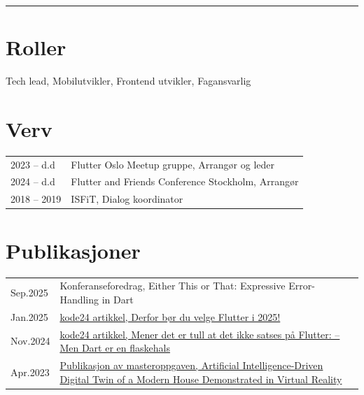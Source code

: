 \documentclass[a4paper,10pt]{article}
\begin{document}
\begin{paracol}{2}
\vspace{0.5em} 
\noindent\rule{\linewidth}{0.2pt}

\section{\ubuntu Roller}
Tech lead, \hspace{0.1em}
Mobilutvikler, \hspace{0.1em}
Frontend utvikler, \hspace{0.1em}
Fagansvarlig

\end{paracol}

\newpage



 
\section{Verv}
\begin{tabularx}{\linewidth}{@{}lX@{}}
2023 -- d.d & Flutter Oslo Meetup gruppe, Arrangør og leder \\
2024 -- d.d & Flutter and Friends Conference Stockholm, Arrangør \\
2018 -- 2019 & ISFiT, Dialog koordinator \\
\end{tabularx}
\vspace{1em}

\section{Publikasjoner}
\begin{tabularx}{\linewidth}{@{}lX@{}}
Sep.2025 & 
Konferanseforedrag, Either This or That: Expressive Error-Handling in Dart \\
Jan.2025 & 
\href{https://www.kode24.no/artikkel/derfor-bor-du-velge-flutter-i-2025/82529763}{kode24 artikkel, Derfor bør du velge Flutter i 2025!} \\
Nov.2024 & 
\href{https://www.kode24.no/artikkel/mener-det-er-tull-at-det-ikke-satses-pa-flutter-men-dart-er-en-flaskehals/82169214}{kode24 artikkel, Mener det er tull at det ikke satses på Flutter: – Men Dart er en flaskehals} \\
Apr.2023 & 
\href{https://ieeexplore.ieee.org/document/10093855/citations?tabFilter=papers\#citations}{Publikasjon av masteroppgaven, Artificial Intelligence-Driven Digital Twin of a Modern House Demonstrated in Virtual Reality} \\
\end{tabularx}
\vspace{1em}
\end{document}
